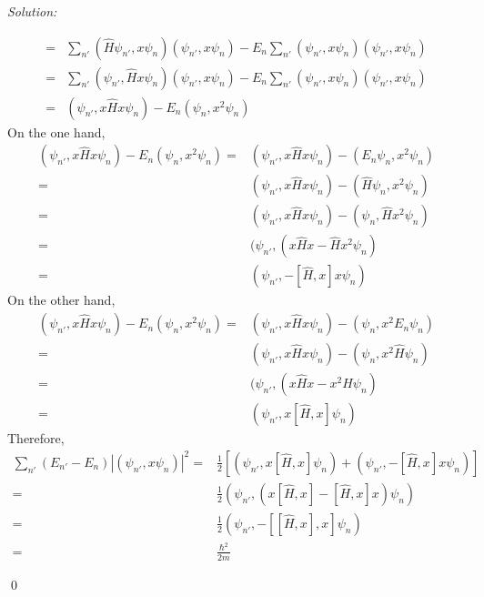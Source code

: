 \documentclass[12pt,a4paper]{article}
\newenvironment{sol}
    {\emph{Solution:}
    }
    {
    \qed
    }
\begin{document}
\begin{sol}
\begin{align}
\nonumber=&\sum_{n'}(\hat{H}\psi_{n'},x\psi_n)(\psi_{n'},x\psi_n)-E_n\sum_{n'}(\psi_{n'},x\psi_n)(\psi_{n'},x\psi_n)\\
\nonumber=&\sum_{n'}(\psi_{n'},\hat{H}x\psi_n)(\psi_{n'},x\psi_n)-E_n\sum_{n'}(\psi_{n'},x\psi_n)(\psi_{n'},x\psi_n)\\
\nonumber=&(\psi_{n'},x\hat{H}x\psi_n)-E_n(\psi_n,x^2\psi_n)
\end{align}
On the one hand,
\begin{align}
\nonumber(\psi_{n'},x\hat{H}x\psi_n)-E_n(\psi_n,x^2\psi_n)=&(\psi_{n'},x\hat{H}x\psi_n)-(E_n\psi_n,x^2\psi_n)\\
\nonumber=&(\psi_{n'},x\hat{H}x\psi_n)-(\hat{H}\psi_n,x^2\psi_n)\\
\nonumber=&(\psi_{n'},x\hat{H}x\psi_n)-(\psi_n,\hat{H}x^2\psi_n)\\
\nonumber=&(\psi_{n'},(x\hat{H}x-\hat{H}x^2\psi_n)\\
=&(\psi_{n'},-[\hat{H},x]x\psi_n)
\end{align}
On the other hand,
\begin{align}
\nonumber(\psi_{n'},x\hat{H}x\psi_n)-E_n(\psi_n,x^2\psi_n)=&(\psi_{n'},x\hat{H}x\psi_n)-(\psi_n,x^2E_n\psi_n)\\
\nonumber=&(\psi_{n'},x\hat{H}x\psi_n)-(\psi_n,x^2\hat{H}\psi_n)\\
\nonumber=&(\psi_{n'},(x\hat{H}x-x^2\hat{H}\psi_n)\\
=&(\psi_{n'},x[\hat{H},x]\psi_n)
\end{align}
Therefore,
\begin{align}
\sum_{n'}(E_{n'}-E_n)|(\psi_{n'},x\psi_n)|^2=&\frac{1}{2}[(\psi_{n'},x[\hat{H},x]\psi_n)+(\psi_{n'},-[\hat{H},x]x\psi_n)]\\
\nonumber=&\frac{1}{2}(\psi_{n'},(x[\hat{H},x]-[\hat{H},x]x)\psi_n)\\
\nonumber=&\frac{1}{2}(\psi_{n'},-[[\hat{H},x],x]\psi_n)\\
=&\frac{\hbar^2}{2m}
\end{align}
\end{sol}
\end{document}
